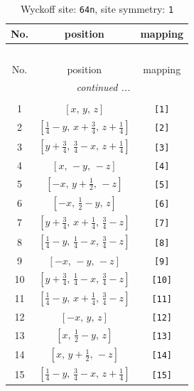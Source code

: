 \documentclass[fleqn,8pt]{jsarticle}
\begin{document}
\begin{longtable}{ccc}
\caption{Wyckoff site: {\tt 64n}, site symmetry: {\tt 1}}
 \\
 \hline \hline
No. & position & mapping \\ \hline \endfirsthead

\multicolumn{2}{l}{\tablename\ \thetable{}} \\
 \hline \hline
No. & position & mapping \\ \hline \endhead

 \hline \hline
\multicolumn{2}{r}{\footnotesize\it continued ...} \\ \endfoot

 \hline \hline
\multicolumn{2}{r}{} \\ \endlastfoot

1 & $\left[ x,\, y,\, z \right]$ & {\tt [1]} \\ \hline
2 & $\left[ \frac{1}{4} - y,\, x + \frac{3}{4},\, z + \frac{1}{4} \right]$ & {\tt [2]} \\ \hline
3 & $\left[ y + \frac{3}{4},\, \frac{3}{4} - x,\, z + \frac{1}{4} \right]$ & {\tt [3]} \\ \hline
4 & $\left[ x,\, - y,\, - z \right]$ & {\tt [4]} \\ \hline
5 & $\left[ - x,\, y + \frac{1}{2},\, - z \right]$ & {\tt [5]} \\ \hline
6 & $\left[ - x,\, \frac{1}{2} - y,\, z \right]$ & {\tt [6]} \\ \hline
7 & $\left[ y + \frac{3}{4},\, x + \frac{1}{4},\, \frac{3}{4} - z \right]$ & {\tt [7]} \\ \hline
8 & $\left[ \frac{1}{4} - y,\, \frac{1}{4} - x,\, \frac{3}{4} - z \right]$ & {\tt [8]} \\ \hline
9 & $\left[ - x,\, - y,\, - z \right]$ & {\tt [9]} \\ \hline
10 & $\left[ y + \frac{3}{4},\, \frac{1}{4} - x,\, \frac{3}{4} - z \right]$ & {\tt [10]} \\ \hline
11 & $\left[ \frac{1}{4} - y,\, x + \frac{1}{4},\, \frac{3}{4} - z \right]$ & {\tt [11]} \\ \hline
12 & $\left[ - x,\, y,\, z \right]$ & {\tt [12]} \\ \hline
13 & $\left[ x,\, \frac{1}{2} - y,\, z \right]$ & {\tt [13]} \\ \hline
14 & $\left[ x,\, y + \frac{1}{2},\, - z \right]$ & {\tt [14]} \\ \hline
15 & $\left[ \frac{1}{4} - y,\, \frac{3}{4} - x,\, z + \frac{1}{4} \right]$ & {\tt [15]} \\ \hline

\end{longtable}
\end{document}
